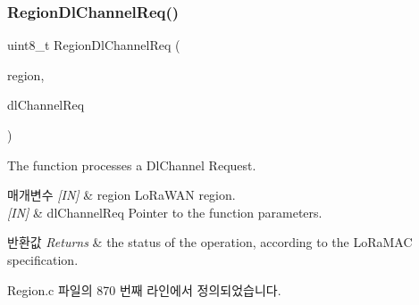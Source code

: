 \subsubsection{\texorpdfstring{Region\+Dl\+Channel\+Req()}{RegionDlChannelReq()}}
{\footnotesize\ttfamily uint8\+\_\+t Region\+Dl\+Channel\+Req (\begin{DoxyParamCaption}\item[{\mbox{\hyperlink{group___l_o_r_a_m_a_c_ga80c48efda9ae02e14b58160d34a798dd}{Lo\+Ra\+Mac\+Region\+\_\+t}}}]{region,  }\item[{\mbox{\hyperlink{group___r_e_g_i_o_n_gae0d608ff1f8ea0a430e4f9a4c38ec7f3}{Dl\+Channel\+Req\+Params\+\_\+t}} $\ast$}]{dl\+Channel\+Req }\end{DoxyParamCaption})}



The function processes a Dl\+Channel Request. 


\begin{DoxyParams}{매개변수}
{\em \mbox{[}\+I\+N\mbox{]}} & region Lo\+Ra\+W\+AN region.\\
\hline
{\em \mbox{[}\+I\+N\mbox{]}} & dl\+Channel\+Req Pointer to the function parameters.\\
\hline
\end{DoxyParams}

\begin{DoxyRetVals}{반환값}
{\em Returns} & the status of the operation, according to the Lo\+Ra\+M\+AC specification. \\
\hline
\end{DoxyRetVals}


Region.\+c 파일의 870 번째 라인에서 정의되었습니다.


